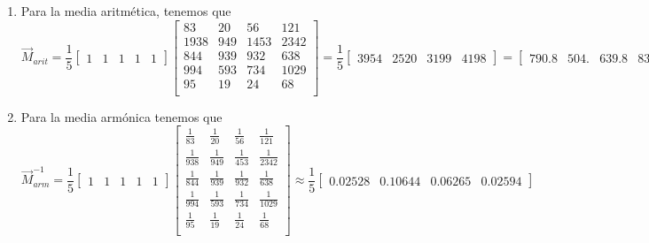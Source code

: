 \documentclass[]{article}
\begin{document}
    \begin{enumerate}
        \item {
            Para la media aritmética, tenemos que 
            \[\vec{M}_{arit} = 
            \frac{1}{5}
            \begin{bmatrix}
                1 & 1 & 1 & 1 & 1 
            \end{bmatrix}
            \begin{bmatrix}
                83 & 20 & 56 & 121 \\
                1938 & 949 & 1453 & 2342 \\
                844 & 939 & 932 & 638 \\
                994 & 593 & 734 & 1029 \\
                95 & 19 & 24 & 68 \\
            \end{bmatrix}
            = 
            \frac{1}{5}
            \begin{bmatrix}
                3954 & 2520 & 3199 & 4198
            \end{bmatrix}
            = 
            \begin{bmatrix}
                790.8 & 504.  & 639.8 & 839.6
            \end{bmatrix}
            \]
        }
        \item {
            Para la media armónica tenemos que 
            \[\vec{M}_{arm}^{-1} = 
            \frac{1}{5}
            \begin{bmatrix}
                1 & 1 & 1 & 1 & 1 
            \end{bmatrix}
            \begin{bmatrix}
                \frac{1}{ 83} &\frac{1}{ 20} &\frac{1}{ 56} & \frac{1}{121} \\
                \frac{1}{938} & \frac{1}{949} & \frac{1}{453} & \frac{1}{2342} \\
                \frac{1}{844} & \frac{1}{939} & \frac{1}{932} & \frac{1}{638} \\
                \frac{1}{994} & \frac{1}{593} & \frac{1}{734} & \frac{1}{1029} \\
                \frac{1}{ 95} &\frac{1}{ 19} &\frac{1}{ 24} & \frac{1}{68} \\
            \end{bmatrix}
            \approx
            \frac{1}{5}
            \begin{bmatrix}
                0.02528 & 0.10644 & 0.06265 & 0.02594

\end{bmatrix}\]}
\end{enumerate}
\end{document}
